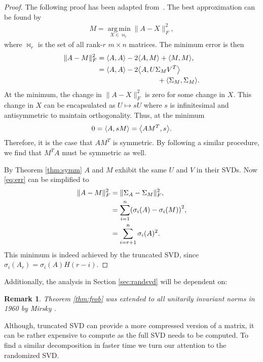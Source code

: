 \documentclass[11pt, a4paper, twocolumn]{article}
\let\originalleft\left
\let\originalright\right
\renewcommand{\left}{\mathopen{}\mathclose\bgroup\originalleft}
\renewcommand{\right}{\aftergroup\egroup\originalright}
\DeclareMathOperator{\argmin}{arg\,min}
\newtheorem{remark}{Remark}
\begin{document}
\begin{proof}
    The following proof has been adapted from~\cite{eckart}. The best approximation can be found by
    \begin{align}
        M = \underset{X \in \bowtie_r}{\argmin} \| A - X \|_F^2,
    \end{align}
    where $\bowtie_r$ is the set of all rank-$r$ $m \times n$ matrices. The minimum error is then
    \begin{align}
        \label{eq:err}
        \| A - M \|_F^2 &= \left< A, A \right> - 2 \left< A, M \right> + \left< M, M \right>, \\
        &= \left< A, A \right> - 2 \left< A, U \Sigma_M V^T \right> \\
        \nonumber & \hspace{3cm} + \left< \Sigma_M, \Sigma_M \right>.
    \end{align}
    At the minimum, the change in $\| A - X \|_F^2$ is zero for some change in $X$. This change in $X$ can be encapsulated as $U \mapsto sU$ where $s$ is infinitesimal and antisymmetric to maintain orthogonality. Thus, at the minimum
    \begin{align}
        0 = \left< A, s M \right> = \left< A M^T, s \right>.
    \end{align}
    Therefore, it is the case that $A M^T$ is symmetric. By following a similar procedure, we find that $M^T A$ must be symmetric as well.

    By Theorem \ref{thm:symm} $A$ and $M$ exhibit the same $U$ and $V$ in their SVDs. Now \eqref{eq:err} can be simplified to
    \begin{align}
        \| A - M \|_F^2 &= \| \Sigma_A - \Sigma_M \|_F^2, \\
        &= \sum_{i=1}^n \left( \sigma_i(A) - \sigma_i(M) \right)^2, \\
        &= \sum_{i = r+1}^n \sigma_i(A)^2.
    \end{align}
    This minimum is indeed achieved by the truncated SVD, since $\sigma_i(A_r) = \sigma_i(A) H(r - i)$.
\end{proof}
\noindent Additionally, the analysis in Section \ref{sec:randsvd} will be dependent on:
\begin{remark}
    Theorem \ref{thm:frob} was extended to all unitarily invariant norms in 1960 by Mirsky \cite{mirsky}.
    \label{thm:unitary}
\end{remark}

Although, truncated SVD can provide a more compressed version of a matrix, it can be rather expensive to compute as the full SVD needs to be computed. To find a similar decomposition in faster time we turn our attention to the randomized SVD.
\end{document}
